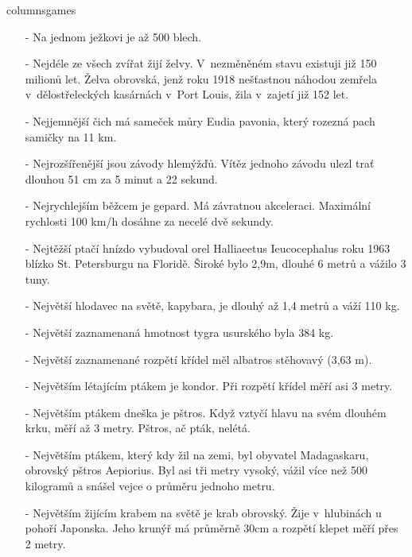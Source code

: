 \begin{multicols}{\value{columnsgames}columnsgames}
\begin{itemize}
\item[-] Na jednom ježkovi je až 500 blech.

\item[-] Nejdéle ze všech zvířat žijí želvy. V~nezměněném stavu 
existuji již 150 milionů let. Želva obrovská, jenž roku 1918 
nešťastnou náhodou zemřela v~dělostřeleckých kasárnách 
v~Port Louis, žila v~zajetí již 152 let.

\item[-] Nejjemnější čich má sameček můry Eudia pavonia, který rozezná 
pach samičky na 11 km.

\item[-] Nejrozšířenější jsou závody hlemýžďů. Vítěz jednoho závodu ulezl 
trať dlouhou 51 cm za 5 minut a 22 sekund.

\item[-] Nejrychlejším běžcem je gepard. Má závratnou akceleraci. Maximální 
rychlosti 100 km/h dosáhne za necelé dvě sekundy.

\item[-] Nejtěžší ptačí hnízdo vybudoval orel Halliaeetus Ieucocephalus 
roku 1963 blízko St. Petersburgu na Floridě. Široké bylo 2,9m, 
dlouhé 6 metrů a vážilo 3 tuny.

\item[-] Největší hlodavec na světě, kapybara, je dlouhý až 1,4 metrů 
a váží 110 kg.

\item[-] Největší zaznamenaná hmotnost tygra usurského byla 384 kg.

\item[-] Největší zaznamenané rozpětí křídel měl albatros stěhovavý
(3,63 m).

\item[-] Největším létajícím ptákem je kondor. Při rozpětí křídel měří 
asi 3 metry.

\item[-] Největším ptákem dneška je pštros. Když vztyčí hlavu na svém 
dlouhém krku, měří až 3 metry. Pštros, ač pták, nelétá.

\item[-] Největším ptákem, který kdy žil na zemi, byl obyvatel Madagaskaru, 
obrovský pštros Aepiorius. Byl asi tři metry vysoký, vážil více 
než 500 kilogramů a snášel vejce o průměru jednoho metru.

\item[-] Největším žijícím krabem na světě je krab obrovský. Žije v~hlubinách 
u pohoří Japonska. Jeho krunýř má průměrně 30cm a rozpětí klepet 
měří přes 2 metry.


\end{itemize}
\end{multicols}
